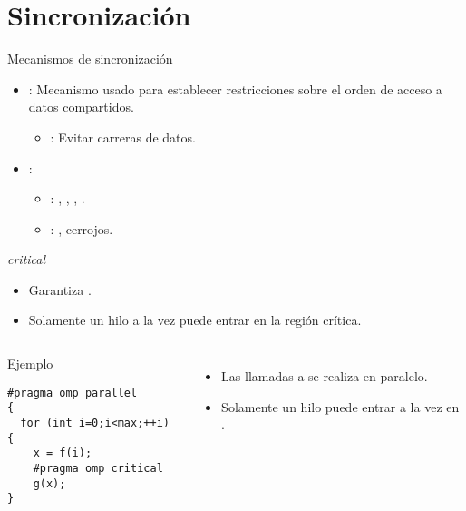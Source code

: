 \section{Sincronización}

\begin{frame}[t]{Mecanismos de sincronización}
\begin{itemize}
  \item {}: Mecanismo usado para establecer
        restricciones sobre el orden de acceso a datos compartidos.
    \begin{itemize}
      \item {}: Evitar carreras de datos.
    \end{itemize}

  \item {}:
    \begin{itemize}
      \item {}: , , , .
      \item {}: , cerrojos.
    \end{itemize}
\end{itemize}
\end{frame}

\begin{frame}[t,fragile]{\emph{critical}}
\begin{itemize}
  \item Garantiza .
  \item Solamente un hilo a la vez puede entrar en la región crítica.
\end{itemize}

\begin{columns}

\begin{block}{Ejemplo}
\begin{lstlisting}
#pragma omp parallel
{
  for (int i=0;i<max;++i) {
    x = f(i);
    #pragma omp critical
    g(x);
}
\end{lstlisting}
\end{block}

\begin{itemize}
  \item Las llamadas a  se realiza en paralelo.
  \item Solamente un hilo puede entrar a la vez en .
\end{itemize}

\end{columns}
\end{frame}

